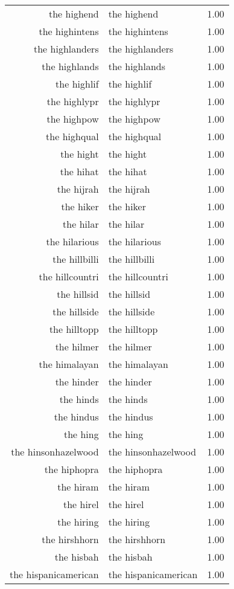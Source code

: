 \begin{table}[ht]
\begin{tabular}{rlr}
  the highend & the highend & 1.00 \\ 
  the highintens & the highintens & 1.00 \\ 
  the highlanders & the highlanders & 1.00 \\ 
  the highlands & the highlands & 1.00 \\ 
  the highlif & the highlif & 1.00 \\ 
  the highlypr & the highlypr & 1.00 \\ 
  the highpow & the highpow & 1.00 \\ 
  the highqual & the highqual & 1.00 \\ 
  the hight & the hight & 1.00 \\ 
  the hihat & the hihat & 1.00 \\ 
  the hijrah & the hijrah & 1.00 \\ 
  the hiker & the hiker & 1.00 \\ 
  the hilar & the hilar & 1.00 \\ 
  the hilarious & the hilarious & 1.00 \\ 
  the hillbilli & the hillbilli & 1.00 \\ 
  the hillcountri & the hillcountri & 1.00 \\ 
  the hillsid & the hillsid & 1.00 \\ 
  the hillside & the hillside & 1.00 \\ 
  the hilltopp & the hilltopp & 1.00 \\ 
  the hilmer & the hilmer & 1.00 \\ 
  the himalayan & the himalayan & 1.00 \\ 
  the hinder & the hinder & 1.00 \\ 
  the hinds & the hinds & 1.00 \\ 
  the hindus & the hindus & 1.00 \\ 
  the hing & the hing & 1.00 \\ 
  the hinsonhazelwood & the hinsonhazelwood & 1.00 \\ 
  the hiphopra & the hiphopra & 1.00 \\ 
  the hiram & the hiram & 1.00 \\ 
  the hirel & the hirel & 1.00 \\ 
  the hiring & the hiring & 1.00 \\ 
  the hirshhorn & the hirshhorn & 1.00 \\ 
  the hisbah & the hisbah & 1.00 \\ 
  the hispanicamerican & the hispanicamerican & 1.00 \\ 

\end{tabular}
\end{table}
